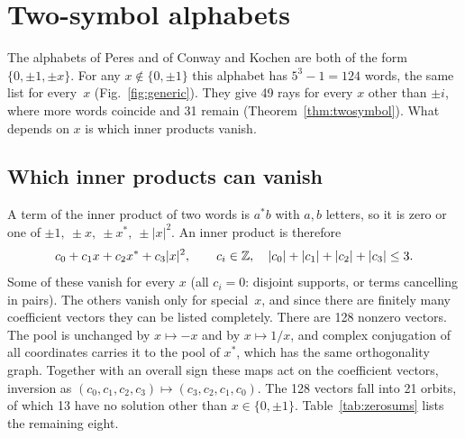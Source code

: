 \section{Two-symbol alphabets}\label{sec:real}

The alphabets of Peres and of Conway and Kochen are both of the form $\{0,\pm1,\pm x\}$.  For any
$x\notin\{0,\pm1\}$ this alphabet has $5^3-1=124$ words, the same list for every~$x$
(Fig.~\ref{fig:generic}).  They give 49 rays for every $x$ other than $\pm i$, where more
words coincide and 31 remain (Theorem~\ref{thm:twosymbol}).  What depends on $x$ is which
inner products vanish.

\subsection{Which inner products can vanish}

A term of the inner product of two words is $a^{*}b$ with $a,b$ letters, so it is zero or one of
$\pm1,\ \pm x,\ \pm x^{*},\ \pm|x|^2$.  An inner product is therefore
\[
c_0+c_1x+c_2x^{*}+c_3|x|^2,\qquad c_i\in\mathbb{Z},\quad |c_0|+|c_1|+|c_2|+|c_3|\le 3 .
\]
Some of these vanish for every $x$ (all $c_i=0$: disjoint supports, or terms cancelling in
pairs).  The others vanish only for special~$x$, and since there are finitely many coefficient
vectors they can be listed completely.  There are 128 nonzero vectors.  The pool is unchanged by
$x\mapsto-x$ and by $x\mapsto1/x$, and complex conjugation of all coordinates carries it to the
pool of $x^{*}$, which has the same orthogonality graph.  Together with an overall sign these
maps act on the coefficient vectors, inversion as
$(c_0,c_1,c_2,c_3)\mapsto(c_3,c_2,c_1,c_0)$.  The 128 vectors fall into 21 orbits, of which 13
have no solution other than $x\in\{0,\pm1\}$.  Table~\ref{tab:zerosums} lists the remaining
eight.

\begin{table}[t]
\centering
\caption{Every relation of at most three terms that can make an inner product of two words over
$\{0,\pm1,\pm x\}$ vanish for some but not all $x$, up to the symmetries $x\mapsto-x$,
$x\mapsto x^{*}$, $x\mapsto1/x$ and overall sign (computed by \texttt{ks\_zero\_sums\_v10.py}).
The row $x-x^{*}=0$ is the reason real alphabets have orthogonalities that generic complex ones
lack.
The rows $2+x=0$ and $1+2x=0$ describe the same pool, since $S$ is unchanged by $x\mapsto 1/x$.
A row says where extra orthogonalities appear; it says nothing by itself about colorability.}
\label{tab:zerosums}

\end{table}

